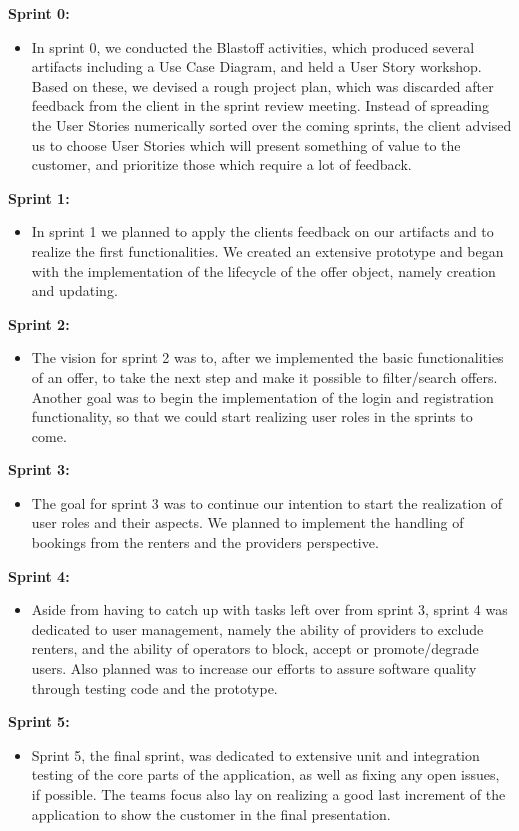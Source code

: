 \textbf{Sprint 0:}
\begin{itemize}
    \item In sprint 0, we conducted the Blastoff activities, which produced several artifacts including a Use Case Diagram, and held a User Story workshop. Based on these, we devised a rough project plan, which was discarded after feedback from the client in the sprint review meeting. Instead of spreading the User Stories numerically sorted over the coming sprints, the client advised us to choose User Stories which will present something of value to the customer, and prioritize those which require a lot of feedback.
\end{itemize}
\textbf{Sprint 1:}
\begin{itemize}
    \item In sprint 1 we planned to apply the clients feedback on our artifacts and to realize the first functionalities. We created an extensive prototype and began with the implementation of the lifecycle of the offer object, namely creation and updating.
\end{itemize}
\textbf{Sprint 2:}
\begin{itemize}
    \item The vision for sprint 2 was to, after we implemented the basic functionalities of an offer, to take the next step and make it possible to filter/search offers. Another goal was to begin the implementation of the login and registration functionality, so that we could start realizing user roles in the sprints to come.
\end{itemize}
\textbf{Sprint 3:}
\begin{itemize}
    \item The goal for sprint 3 was to continue our intention to start the realization of user roles and their aspects. We planned to implement the handling of bookings from the renters and the providers perspective.
\end{itemize}
\textbf{Sprint 4:}
\begin{itemize}
    \item Aside from having to catch up with tasks left over from sprint 3, sprint 4 was dedicated to user management, namely the ability of providers to exclude renters, and the ability of operators to block, accept or promote/degrade users. Also planned was to increase our efforts to assure software quality through testing code and the prototype.
\end{itemize}
\textbf{Sprint 5:}
\begin{itemize}
    \item Sprint 5, the final sprint, was dedicated to extensive unit and integration testing of the core parts of the application, as well as fixing any open issues, if possible. The teams focus also lay on realizing a good last increment of the application to show the customer in the final presentation.
\end{itemize}